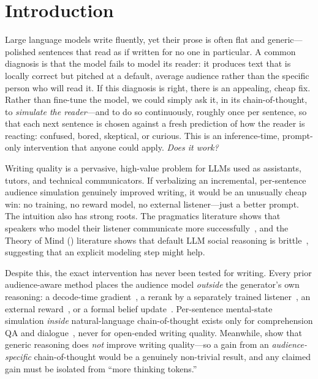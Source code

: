 \section{Introduction}
\label{sec:intro}

Large language models write fluently, yet their prose is often flat and generic---polished
sentences that read as if written for no one in particular. A common diagnosis is that the model
fails to model its reader: it produces text that is locally correct but pitched at a default,
average audience rather than the specific person who will read it. If this diagnosis is right,
there is an appealing, cheap fix. Rather than fine-tune the model, we could simply ask it, in its
chain-of-thought, to \emph{simulate the reader}---and to do so continuously, roughly once per
sentence, so that each next sentence is chosen against a fresh prediction of how the reader is
reacting: confused, bored, skeptical, or curious. This is an inference-time, prompt-only
intervention that anyone could apply. \emph{Does it work?}

 Writing quality is a pervasive, high-value problem for LLMs used as
assistants, tutors, and technical communicators. If verbalizing an incremental,
per-sentence audience simulation genuinely improved writing, it would be an unusually cheap win:
no training, no reward model, no external listener---just a better prompt. The intuition also has
strong roots. The pragmatics literature shows that speakers who model their listener communicate
more successfully~\citep{andreas2016reasoning,fried2023pragmatics,takmaz2023speaking}, and the
Theory of Mind (\tom) literature shows that default LLM social reasoning is
brittle~\citep{ullman2023large,shapira2023clever}, suggesting that an explicit modeling step might
help.

 Despite this, the exact intervention has never been tested for writing. Every
prior audience-aware method places the audience model \emph{outside} the generator's own
reasoning: a decode-time gradient~\citep{takmaz2023speaking}, a rerank by a separately trained
listener~\citep{andreas2016reasoning,coderesa2025}, an external
reward~\citep{styleinfusion2023}, or a formal belief update~\citep{crsa2025}. Per-sentence
mental-state simulation \emph{inside} natural-language chain-of-thought exists only for
comprehension QA and dialogue~\citep{perceptom2024,thoughttracing2025,tomagent2025}, never for
open-ended writing quality. Meanwhile, \citet{chakrabarty2025aislop} show that generic reasoning
does \emph{not} improve writing quality---so a gain from an \emph{audience-specific}
chain-of-thought would be a genuinely non-trivial result, and any claimed gain must be isolated
from ``more thinking tokens.''

